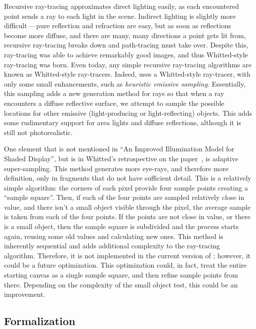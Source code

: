 Recursive ray-tracing approximates direct lighting easily, as each encountered point sends a ray to each light in the scene.
Indirect lighting is slightly more difficult\,---\,pure reflection and refraction are easy, but as soon as reflections become more diffuse, and there are many, many directions a point gets lit from, recursive ray-tracing breaks down and path-tracing must take over.
Despite this, ray-tracing was able to achieve remarkably good images, and thus Whitted-style ray-tracing was born.
Even today, any simple recursive ray-tracing algorithms are known as Whitted-style ray-tracers.
Indeed, \name{} uses a Whitted-style ray-tracer, with only some small enhancements, such as {\it heuristic emissive sampling}.
Essentially, this sampling adds a new generation method for rays so that when a ray encounters a diffuse reflective surface, we attempt to sample the possible locations for other emissive (light-producing or light-reflecting) objects.
This adds some rudimentary support for area lights and diffuse reflections, although it is still not photorealistic.

One element that is not mentioned in ``An Improved Illumination Model for Shaded Display'', but is in Whitted's retrospective on the paper~\cite{whitted2018explains}, is adaptive super-sampling.
This method generates more eye-rays, and therefore more definition, only in fragments that do not have sufficient detail.
This is a relatively simple algorithm: the corners of each pixel provide four sample points creating a ``sample square''.
Then, if each of the four points are sampled relatively close in value, and there isn't a small object visible through the pixel, the average sample is taken from each of the four points.
If the points are not close in value, or there is a small object, then the sample square is subdivided and the process starts again, reusing some old values and calculating new ones.
This method is inherently sequential and adds additional complexity to the ray-tracing algorithm.
Therefore, it is not implemented in the current version of \name{}; however, it could be a future optimization.
This optimization could, in fact, treat the entire starting canvas as a single sample square, and then refine sample points from there.
Depending on the complexity of the small object test, this could be an improvement.

\subsection{Formalization}
\label{ch:relatedwork:discovery:formalization}

